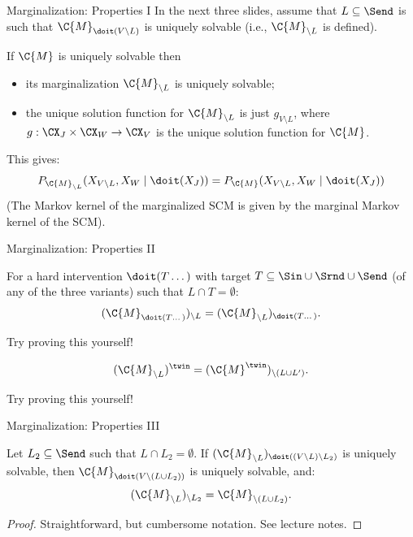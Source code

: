 \begin{frame}{Marginalization: Properties I}
In the next three slides, assume that
$L \subseteq \Send$ is such that $\C{M}_{\doit(V \setminus L)}$ is uniquely solvable
(i.e., $\C{M}_{\setminus L}$ is defined).
\begin{Lem}
  If $\C{M}$ is uniquely solvable then 
  \begin{itemize}
    \item its marginalization $\C{M}_{\setminus L}$ is uniquely solvable; 
    \item the unique solution function for $\C{M}_{\setminus L}$ is just $g_{V\setminus L}$, where 
  $g : \CX_J \times \CX_W \to \CX_V$ is the unique solution function for $\C{M}$.
  \end{itemize}
\end{Lem}

This gives:
$$P_{\C{M}_{\setminus L}}(X_{V\setminus L},X_W \mid \doit(X_J)) = P_{\C{M}}(X_{V\setminus L},X_W \mid \doit(X_J))$$
(The Markov kernel of the marginalized SCM is given by the marginal Markov kernel of the SCM).
\end{frame}
  
\begin{frame}{Marginalization: Properties II}
  \begin{Prp}
    For a hard intervention $\doit(T\dots)$ with target $T \subseteq \Sin \cup \Srnd \cup \Send$ (of any of the three variants) such that $L \cap T = \emptyset$:
    $$(\C{M}_{\doit(T\dots)})_{\setminus L} = (\C{M}_{\setminus L})_{\doit(T\dots)}.$$
\end{Prp}
Try proving this yourself!

\begin{Prp}
$$(\C{M}_{\setminus L})^\twin = (\C{M}^\twin)_{\setminus (L\cup L')}.$$
\end{Prp}
Try proving this yourself!
\end{frame}

\begin{frame}{Marginalization: Properties III}
\begin{Prp}
  Let $L_2 \subseteq \Send$ such that $L \cap L_2 = \emptyset$.
  If $(\C{M}_{\setminus L})_{\doit((V\setminus L)\setminus L_2)}$ is uniquely solvable, then $\C{M}_{\doit(V\setminus(L\cup L_2))}$ is uniquely solvable, and:
  $$(\C{M}_{\setminus L})_{\setminus L_2} = \C{M}_{\setminus (L\cup L_2)}.$$
\end{Prp}
\begin{proof}
  Straightforward, but cumbersome notation. See lecture notes.
\end{proof}
\end{frame}

